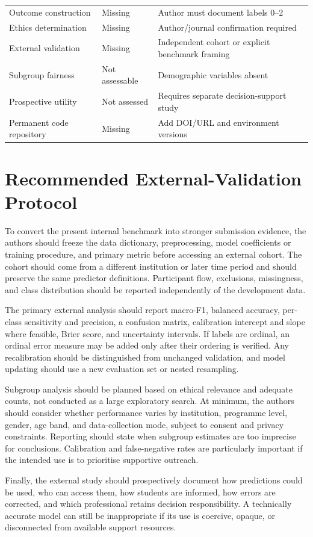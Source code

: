 \documentclass[review]{elsarticle}
\begin{document}
{\begin{longtable}{p{3.5cm}p{1.5cm}p{5.2cm}}
Outcome construction & Missing & Author must document labels 0--2 \\
Ethics determination & Missing & Author/journal confirmation required \\
External validation & Missing & Independent cohort or explicit benchmark framing \\
Subgroup fairness & Not assessable & Demographic variables absent \\
Prospective utility & Not assessed & Requires separate decision-support study \\
Permanent code repository & Missing & Add DOI/URL and environment versions \\
\end{longtable}
}

\clearpage
\section{Recommended External-Validation Protocol}\label{app:external}
To convert the present internal benchmark into stronger submission evidence, the authors should freeze the data dictionary, preprocessing, model coefficients or training procedure, and primary metric before accessing an external cohort. The cohort should come from a different institution or later time period and should preserve the same predictor definitions. Participant flow, exclusions, missingness, and class distribution should be reported independently of the development data.

The primary external analysis should report macro-F1, balanced accuracy, per-class sensitivity and precision, a confusion matrix, calibration intercept and slope where feasible, Brier score, and uncertainty intervals. If labels are ordinal, an ordinal error measure may be added only after their ordering is verified. Any recalibration should be distinguished from unchanged validation, and model updating should use a new evaluation set or nested resampling.

Subgroup analysis should be planned based on ethical relevance and adequate counts, not conducted as a large exploratory search. At minimum, the authors should consider whether performance varies by institution, programme level, gender, age band, and data-collection mode, subject to consent and privacy constraints. Reporting should state when subgroup estimates are too imprecise for conclusions. Calibration and false-negative rates are particularly important if the intended use is to prioritise supportive outreach.

Finally, the external study should prospectively document how predictions could be used, who can access them, how students are informed, how errors are corrected, and which professional retains decision responsibility. A technically accurate model can still be inappropriate if its use is coercive, opaque, or disconnected from available support resources.



\end{document}

